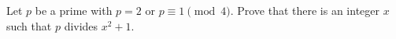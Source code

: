 Let $p$ be a prime with $p=2$ or $p\equiv1\pmod4$. Prove that there is an integer $x$ such that $p$ divides $x^2+1$.
